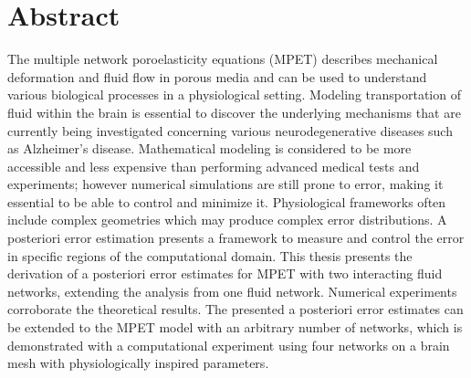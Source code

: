 \chapter{Abstract}

The multiple network poroelasticity equations (MPET) describes mechanical deformation and fluid flow in porous media and can be used to understand various biological processes in a physiological setting. Modeling transportation of fluid within the brain is essential to discover the underlying mechanisms that are currently being investigated concerning various neurodegenerative diseases such as Alzheimer's disease. Mathematical modeling is considered to be more accessible and less expensive than performing advanced medical tests and experiments; however numerical simulations are still prone to error, making it essential to be able to control and minimize it. Physiological frameworks often include complex geometries which may produce complex error distributions. A posteriori error estimation presents a framework to measure and control the error in specific regions of the computational domain. This thesis presents the derivation of a posteriori error estimates for MPET with two interacting fluid networks, extending the analysis from one fluid network. Numerical experiments corroborate the theoretical results. The presented a posteriori error estimates can be extended to the MPET model with an arbitrary number of networks, which is demonstrated with a computational experiment using four networks on a brain mesh with physiologically inspired parameters.


